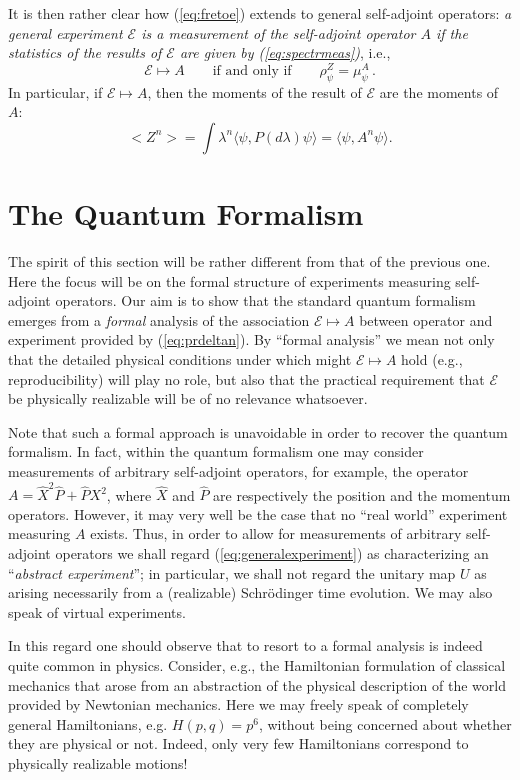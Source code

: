 \documentclass[12pt]{article}
\newcommand{\Sc}{Schr\"{o}dinger}
\newcommand{\sa}{self-adjoint}
\newcommand{\E}{\mbox{$\mathscr{E}$}}
\begin{document}
It is then rather clear how (\ref{eq:fretoe}) extends to general \sa{}
operators: \emph{a general experiment \E{} is a measurement of the
   \sa{} operator $A$ if the statistics of the results of \E{} are
   given by (\ref{eq:spectrmeas})}, i.e.,
\begin{equation}
\E\mapsto A \qquad
\mbox{if and only if}\qquad \rho^{ Z}_{\psi} =\mu^A_\psi \,.
\label{eq:prdeltan}
\end{equation}
In particular, if $\E\mapsto A $, then the moments of the result of
$\E$ are the moments of $A$:
$$
<Z^n>= \int \lambda^n \langle\psi ,P(d\lambda)\psi\rangle=
\langle\psi ,A^n\psi\rangle.  $$

   \section{The Quantum Formalism} \setcounter{equation}{0} The spirit of
   this section will be rather different {}from that of the previous
   one.  Here the focus will be on the formal structure of experiments
   measuring self-adjoint operators.  Our aim is to show that the
   standard quantum formalism emerges {}from a \emph{formal} analysis
   of the association $\E\mapsto A$ between operator and experiment
   provided by (\ref{eq:prdeltan}).  By ``formal analysis'' we mean not
   only that the detailed physical conditions under which might
   $\E\mapsto A$ hold (e.g., reproducibility) will play no role, but
   also that the practical requirement that \E{} be physically
   realizable will be of no relevance whatsoever.

   Note that such a formal approach is unavoidable in order to recover
   the quantum formalism.  In fact, within the quantum formalism one
   may consider measurements of arbitrary \sa{} operators, for example,
   the operator $A= \hat{X}^2\hat{P} + \hat{P}X^{2}$, where $\hat{X}$
   and $\hat{P}$ are respectively the position and the momentum
   operators.  However, it may very well be the case that no ``real
   world'' experiment measuring $A$ exists.  Thus, in order to allow
   for measurements of arbitrary self-adjoint operators we shall regard
   (\ref{eq:generalexperiment}) as characterizing an ``\emph{abstract
     experiment}''; in particular, we shall not regard the unitary map
   $U$ as arising necessarily {}from a (realizable) \Sc{} time
   evolution.  We may also speak of virtual experiments.

   In this regard one should observe that to resort to a formal
   analysis is indeed quite common in physics.  Consider, e.g., the
   Hamiltonian formulation of classical mechanics that arose {}from an
   abstraction of the physical description of the world provided by
   Newtonian mechanics.  Here we may freely speak of completely general
   Hamiltonians, e.g.  $H(p,q)= p^{6}$, without being concerned about
   whether they are physical or not.  Indeed, only very few
   Hamiltonians correspond to physically realizable motions!  \medskip
\end{document}

